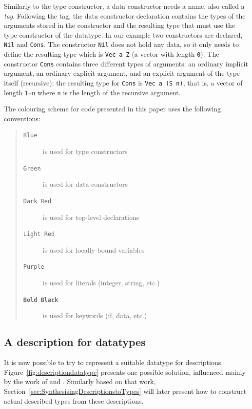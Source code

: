 \documentclass{ituthesis}
\newcommand{\ttconstructor}[1]{\textcolor{constructor-color}{\texttt{#1}}}
\newcommand{\tttype}[1]{\textcolor{type-color}{\texttt{#1}}}
\newcommand{\ttdec}[1]{\textcolor{declared-var-color}{\texttt{#1}}}
\newcommand{\ttvar}[1]{\textcolor{local-var-color}{\texttt{#1}}}
\newcommand{\ttliteral}[1]{\textcolor{literal-color}{\texttt{#1}}}
\theoremstyle{break}
\newenvironment{asideblock}
  {\begin{mdframed}[style=0,%
      leftline=false,rightline=false,leftmargin=2em,rightmargin=2em,%
          innerleftmargin=0pt,innerrightmargin=0pt,linewidth=0.75pt,%
      skipabove=7pt,skipbelow=7pt]\small}
  {\end{mdframed}}
\begin{document}
Similarly to the type constructor, a data constructor needs a name, also called a \textit{tag}.
Following the tag, the data constructor declaration contains the types of the arguments stored in the constructor and the resulting type that must use the type constructor of the datatype.
In our example two constructors are declared, \ttconstructor{Nil} and \ttconstructor{Cons}.
The constructor \ttconstructor{Nil} does not hold any data, so it only needs to define the resulting type which is \tttype{Vec}~\ttvar{a}~\ttconstructor{Z} (a vector with length \ttliteral{0}).
The constructor \ttconstructor{Cons} contains three different types of arguments: an ordinary implicit argument, an ordinary explicit argument, and an explicit argument of the type itself (recursive); the resulting type for \ttconstructor{Cons} is \tttype{Vec}~\ttvar{a}~\texttt{(}\ttconstructor{S}~\ttvar{n}\texttt{)}, that is, a vector of length \ttliteral{1}\texttt{+}\ttvar{n} where \ttvar{n} is the length of the recursive argument.

\begin{asideblock}
  The colouring scheme for code presented in this paper uses the following conventions:
  \begin{quote}
  \begin{description}
    \item[\tttype{Blue}] is used for type constructors
    \item[\ttconstructor{Green}] is used for data constructors
    \item[\ttdec{Dark Red}] is used for top-level declarations
    \item[\ttvar{Light Red}] is used for locally-bound variables
    \item[\ttliteral{Purple}] is used for literals (integer, string, etc.)
    \item[\texttt{\textbf{Bold Black}}] is used for keywords (if, data, etc.)
  \end{description}
  \end{quote}

\end{asideblock}

\subsection{A description for datatypes}
\label{sub:ADescriptionforDatatypes}
It is now possible to try to represent a suitable datatype for descriptions.
Figure~\ref{fig:descriptiondatatype} presents one possible solution, influenced mainly by the work of \textcite{mcbride2010ornamental} and \textcite{diehl2014eliminators}.
Similarly based on that work, Section~\ref{sec:SynthesisingDescriptionstoTypes} will later present how to construct actual described types from these descriptions.
\end{document}
